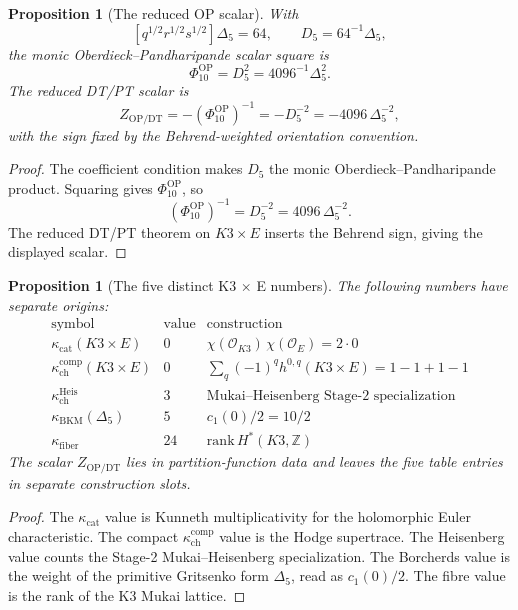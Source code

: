 \documentclass[11pt]{article}
\newtheorem{proposition}[theorem]{Proposition}
\providecommand{\ZZ}{\mathbb{Z}}
\providecommand{\cO}{\mathcal{O}}
\providecommand{\kchcomp}{\kappa_{\mathrm{ch}}^{\mathrm{comp}}}
\providecommand{\kchHeis}{\kappa_{\mathrm{ch}}^{\mathrm{Heis}}}
\providecommand{\kcat}{\kappa_{\mathrm{cat}}}
\providecommand{\kBKM}{\kappa_{\mathrm{BKM}}}
\providecommand{\kfib}{\kappa_{\mathrm{fiber}}}
\providecommand{\DeltaFive}{\Delta_5}
\providecommand{\PhiTen}{\Phi_{10}}
\providecommand{\Dfive}{D_5}
\begin{document}
\begin{proposition}[The reduced OP scalar]
With
\[
  [q^{1/2}r^{1/2}s^{1/2}]\DeltaFive=64,
  \qquad
  \Dfive=64^{-1}\DeltaFive,
\]
the monic Oberdieck--Pandharipande scalar square is
\[
  \PhiTen^{\mathrm{OP}}=\Dfive^2=4096^{-1}\DeltaFive^2.
\]
The reduced DT/PT scalar is
\[
  Z_{\mathrm{OP/DT}}
  =
  -(\PhiTen^{\mathrm{OP}})^{-1}
  =
  -\Dfive^{-2}
  =
  -4096\,\DeltaFive^{-2},
\]
with the sign fixed by the Behrend-weighted orientation convention.
\end{proposition}

\begin{proof}
The coefficient condition makes \(\Dfive\) the monic
Oberdieck--Pandharipande product.  Squaring gives
\(\PhiTen^{\mathrm{OP}}\), so
\[
  (\PhiTen^{\mathrm{OP}})^{-1}
  =
  \Dfive^{-2}
  =
  4096\,\DeltaFive^{-2}.
\]
The reduced DT/PT theorem on \(K3\times E\) inserts the Behrend sign,
giving the displayed scalar.
\end{proof}

\begin{proposition}[The five distinct K3 \(\times\) E numbers]
The following numbers have separate origins:
\[
\begin{array}{c|c|c}
\text{symbol} & \text{value} & \text{construction} \\
\hline
\kcat(K3\times E) & 0
  & \chi(\cO_{K3})\,\chi(\cO_E)=2\cdot 0 \\
\kchcomp(K3\times E) & 0
  & \sum_q(-1)^q h^{0,q}(K3\times E)=1-1+1-1 \\
\kchHeis & 3
  & \text{Mukai--Heisenberg Stage-2 specialization} \\
\kBKM(\DeltaFive) & 5
  & c_1(0)/2=10/2 \\
\kfib & 24
  & \mathrm{rank}\,H^*(K3,\ZZ)
\end{array}
\]
The scalar \(Z_{\mathrm{OP/DT}}\) lies in partition-function data and
leaves the five table entries in separate construction slots.
\end{proposition}

\begin{proof}
The \(\kcat\) value is Kunneth multiplicativity for the holomorphic
Euler characteristic.  The compact \(\kchcomp\) value is the Hodge
supertrace.  The Heisenberg value counts the Stage-2 Mukai--Heisenberg
specialization.  The Borcherds value is the weight of the primitive
Gritsenko form \(\DeltaFive\), read as \(c_1(0)/2\).  The fibre value
is the rank of the K3 Mukai lattice.
\end{proof}
\end{document}
